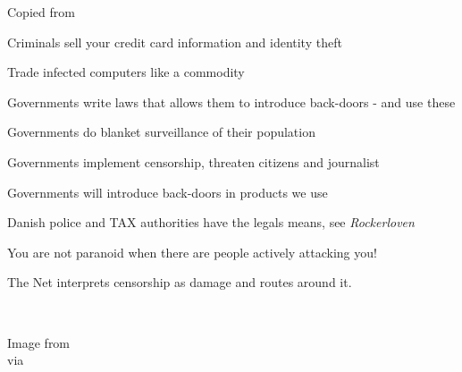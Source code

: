 \documentclass[20pt,landscape,a4paper,footrule]{foils}
\begin{document}
Copied from 

\begin{list2}
\item Criminals sell your credit card information and identity theft
\item Trade infected computers like a commodity
\item Governments write laws that allows them to introduce back-doors - and use these
\item Governments do blanket surveillance of their population
\item Governments implement censorship, threaten citizens and journalist
\item Governments will introduce back-doors in products we use
\item Danish police and TAX authorities have the legals means, see \emph{Rockerloven}
\end{list2}

\vskip 1cm
\centerline{You are not paranoid when there are people actively attacking you!}







\centerline{\color{titlecolor} The Net interprets censorship as damage and routes around it.}


\\



Image from \\
via 


\end{document}
